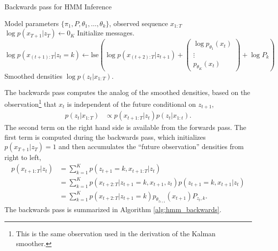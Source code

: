 \documentclass[14pt]{extarticle}
\begin{document}
\begin{algorithm}
  \begin{algorithmic}
   \caption{Backwards pass for HMM Inference}
   \label{alg:hmm_backwards}
    Model parameters $\{\pi_{1}, P, \theta_1, \dots, \theta_k\}$, observed sequence $x_{1:T}$
   \STATE $\log p\left(x_{T + 1} \vert z_T\right) \leftarrow 0_{K}$ \hfill Initialize messages.
   \STATE $\log p\left(x_{\left(t + 1\right): T} \vert z_{t} = k\right) \leftarrow \text{lse}\left(\log p\left(x_{\left(t + 2\right):T} \vert z_{t + 1}\right) + \begin{pmatrix} \log p_{\theta_{1}}\left(x_{t}\right) \\ \vdots \\ p_{\theta_{K}}\left(x_t\right)\end{pmatrix} + \log P_{k}\right)$
   \ENDFOR
   \ENDFOR
    Smoothed densities $\log p\left(z_{t} \vert x_{1:T}\right)$.
  \end{algorithmic}
\end{algorithm}

The backwards pass computes the analog of the smoothed densities, based on the
observation\footnote{This is the same observation used in the derivation of the
  Kalman smoother.} that $x_{t}$ is independent of the future conditional on
$z_{t + 1}$,
\begin{align*}
  p\left(z_{t} \vert x_{1:T}\right) &\propto p\left(x_{t + 1:T} \vert z_{t}\right) p\left(z_{t} \vert x_{1:t}\right).
\end{align*}
The second term on the right hand side is available from the forwards pass. The
first term is computed during the backwards pass, which initializes $p\left(x_{T
  + 1} \vert z_{T}\right) = 1$ and then accumulates the ``future observation''
densities from right to left,
\begin{align*}
  p\left(x_{t + 1: T} \vert z_{t}\right) &= \sum_{k = 1}^{K} p\left(z_{t + 1} = k, x_{t + 1 : T} \vert z_{t}\right) \\
  &= \sum_{k = 1}^{K} p\left(x_{t + 2: T}\vert z_{t + 1} = k, x_{t + 1}, z_{t}\right) p\left(z_{t + 1} = k, x_{t + 1} \vert z_{t}\right) \\
  &= \sum_{k = 1}^{K} p\left(x_{t + 2:T}\vert z_{t + 1} = k\right)p_{\theta_{z_{t + 1}}}\left(x_{t + 1}\right) P_{z_{t}, k}.
\end{align*}
The backwards pass is summarized in Algorithm \ref{alg:hmm_backwards}.
\end{document}
